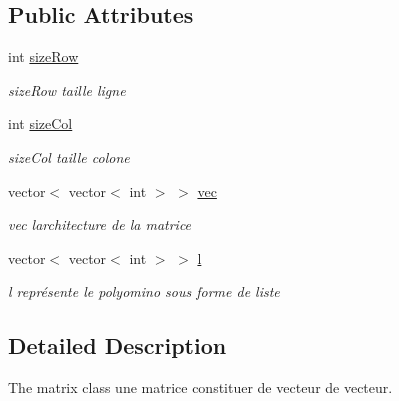 \subsection*{Public Attributes}
\begin{DoxyCompactItemize}
\item 
int \hyperlink{classmatrix_accbce5e857edcccbc46f704db8d390a2}{size\+Row}\hypertarget{classmatrix_accbce5e857edcccbc46f704db8d390a2}{}\label{classmatrix_accbce5e857edcccbc46f704db8d390a2}

\begin{DoxyCompactList}\small\item\em size\+Row taille ligne \end{DoxyCompactList}\item 
int \hyperlink{classmatrix_a502f7b1bbd4aca8f56b562892aa7f550}{size\+Col}\hypertarget{classmatrix_a502f7b1bbd4aca8f56b562892aa7f550}{}\label{classmatrix_a502f7b1bbd4aca8f56b562892aa7f550}

\begin{DoxyCompactList}\small\item\em size\+Col taille colone \end{DoxyCompactList}\item 
vector$<$ vector$<$ int $>$ $>$ \hyperlink{classmatrix_a54bc336decc92a43de11b1b712af4e6a}{vec}\hypertarget{classmatrix_a54bc336decc92a43de11b1b712af4e6a}{}\label{classmatrix_a54bc336decc92a43de11b1b712af4e6a}

\begin{DoxyCompactList}\small\item\em vec l\textquotesingle{}architecture de la matrice \end{DoxyCompactList}\item 
vector$<$ vector$<$ int $>$ $>$ \hyperlink{classmatrix_a8a0bb1e77b1064c20a53aa51dea340a0}{l}\hypertarget{classmatrix_a8a0bb1e77b1064c20a53aa51dea340a0}{}\label{classmatrix_a8a0bb1e77b1064c20a53aa51dea340a0}

\begin{DoxyCompactList}\small\item\em l représente le polyomino sous forme de liste \end{DoxyCompactList}\end{DoxyCompactItemize}


\subsection{Detailed Description}
The matrix class une matrice constituer de vecteur de vecteur. 

